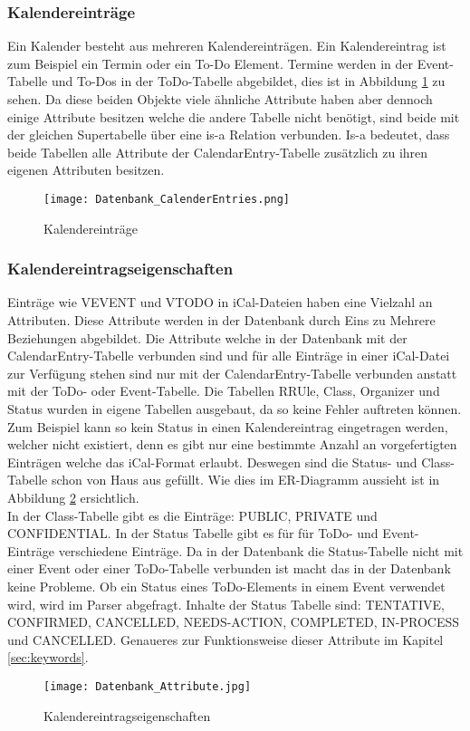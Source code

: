 \subsubsection*{Kalendereinträge}
\label{ref:kalenderEintraege}
Ein Kalender besteht aus mehreren Kalendereinträgen. Ein Kalendereintrag ist zum Beispiel ein Termin oder ein To-Do Element. Termine werden in der Event-Tabelle und To-Dos in der ToDo-Tabelle abgebildet, dies ist in Abbildung \ref{fig:calendarEntries} zu sehen. Da diese beiden Objekte viele ähnliche Attribute haben aber dennoch einige Attribute besitzen welche die andere Tabelle nicht benötigt, sind beide mit der gleichen Supertabelle über eine is-a Relation verbunden. Is-a bedeutet, dass beide Tabellen alle Attribute der CalendarEntry-Tabelle zusätzlich zu ihren eigenen Attributen besitzen.
\begin{figure}[H]
	\texttt{[image: Datenbank\_CalenderEntries.png]}
    \caption{Kalendereinträge}
    \label{fig:calendarEntries}
\end{figure}

\subsubsection*{Kalendereintragseigenschaften}
\label{ref:kalendereintragseigenschaften}
Einträge wie VEVENT und VTODO in iCal-Dateien haben eine Vielzahl an Attributen. Diese Attribute werden in der Datenbank durch Eins zu Mehrere Beziehungen abgebildet. Die Attribute welche in der Datenbank mit der CalendarEntry-Tabelle verbunden sind und für alle Einträge in einer iCal-Datei zur Verfügung stehen sind nur mit der CalendarEntry-Tabelle verbunden anstatt mit der ToDo- oder Event-Tabelle. Die Tabellen RRUle, Class, Organizer und Status wurden in eigene Tabellen ausgebaut, da so keine Fehler auftreten können. Zum Beispiel kann so kein Status in einen Kalendereintrag eingetragen werden, welcher nicht existiert, denn es gibt nur eine bestimmte Anzahl an vorgefertigten Einträgen welche das iCal-Format erlaubt. Deswegen sind die Status- und Class-Tabelle schon von Haus aus gefüllt. Wie dies im ER-Diagramm aussieht ist in Abbildung \ref{fig:kalendereintragseigenschaften} ersichtlich.\\
In der Class-Tabelle gibt es die Einträge: PUBLIC, PRIVATE und CONFIDENTIAL. In der Status Tabelle gibt es für für ToDo- und Event-Einträge verschiedene Einträge. Da in der Datenbank die Status-Tabelle nicht mit einer Event oder einer ToDo-Tabelle verbunden ist macht das in der Datenbank keine Probleme. Ob ein Status eines ToDo-Elements in einem Event verwendet wird, wird im Parser abgefragt. Inhalte der Status Tabelle sind: TENTATIVE, CONFIRMED, CANCELLED, NEEDS-ACTION, COMPLETED, IN-PROCESS und CANCELLED. Genaueres zur Funktionsweise dieser Attribute im Kapitel \ref{sec:keywords}.
\begin{figure}[H]
	\texttt{[image: Datenbank\_Attribute.jpg]}
    \caption{Kalendereintragseigenschaften}
    \label{fig:kalendereintragseigenschaften}
\end{figure}


